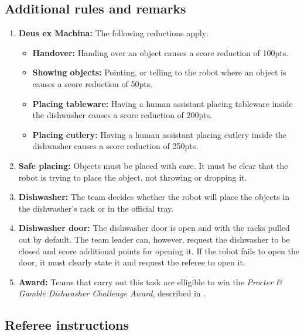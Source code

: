 \subsection*{Additional rules and remarks}
\begin{enumerate}[nosep]
	\item \textbf{Deus ex Machina:} The following reductions apply:
	\begin{itemize}[nosep]
		\item \textbf{Handover:} Handing over an object causes a score reduction of 100pts.
		\item \textbf{Showing objects:} Pointing, or telling to the robot where an object is causes a score reduction of 50pts.
		\item \textbf{Placing tableware:} Having a human assistant placing tableware inside the dishwasher causes a score reduction of 200pts.
		\item \textbf{Placing cutlery:} Having a human assistant placing cutlery inside the dishwasher causes a score reduction of 250pts.
	\end{itemize}

	\item \textbf{Safe placing:} Objects must be placed with care. It must be clear that the robot is trying to place the object, not throwing or dropping it.

	\item \textbf{Dishwasher:} The team decides whether the robot will place the objects in the dishwasher's rack or in the official tray.

	\item \textbf{Dishwasher door:} The dishwasher door is open and with the racks pulled out by default.
	The team leader can, however, request the dishwasher to be closed and score additional points for opening it. If the robot fails to open the door, it must clearly state it and request the referee to open it.

	\item \textbf{Award:} Teams that carry out this task are elligible to win the \textit{Procter \& Gamble Dishwasher Challenge Award}, described in .

\end{enumerate}

\subsection*{Referee instructions}

